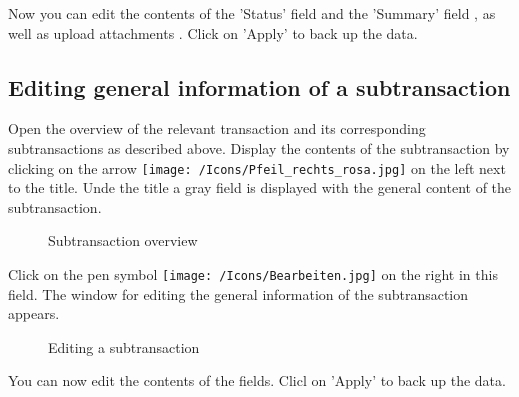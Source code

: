 Now you can edit the contents of the 'Status' field  and the 'Summary' field , as well as upload attachments . Click on 'Apply'  to back up the data.

\subsection{Editing general information of a subtransaction}

Open the overview of the relevant transaction and its corresponding subtransactions as described above. Display the contents of the subtransaction by clicking on the arrow \texttt{[image: /Icons/Pfeil\_rechts\_rosa.jpg]} on the left next to the title. Unde the title a gray field  is displayed with the general content of the subtransaction.

\begin{figure}[H]
\caption{Subtransaction overview}
\end{figure}

Click on the pen symbol \texttt{[image: /Icons/Bearbeiten.jpg]}  on the right in this field. The window for editing the general information of the subtransaction appears.

\begin{figure}[H]
\caption{Editing a subtransaction}
\end{figure}

You can now edit the contents of the fields. Clicl on 'Apply'  to back up the data.
